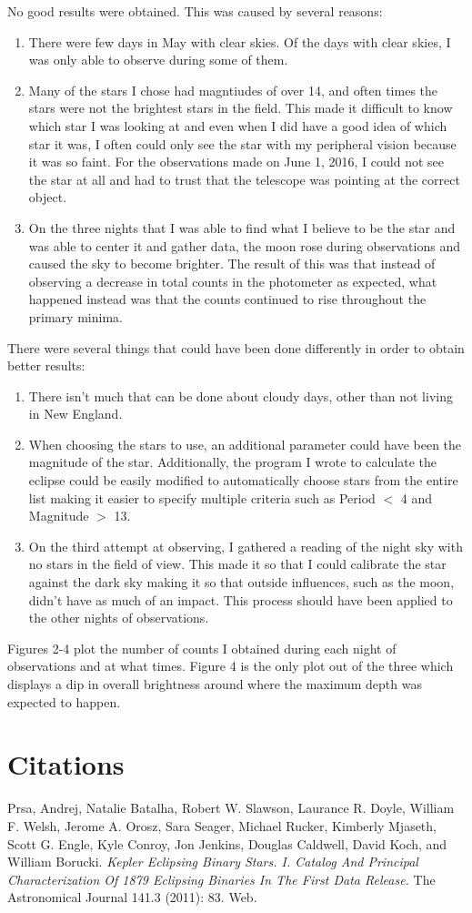 \documentclass[12pt]{article}
\begin{document}
	No good results were obtained. This was caused by several reasons:
	\begin{enumerate}
		\item There were few days in May with clear skies. Of the days with clear skies, I was only able to observe during some of them.
		\item Many of the stars I chose had magntiudes of over 14, and often times the stars were not the brightest stars in the field. This made it difficult to know which star I was looking at and even when I did have a good idea of which star it was, I often could only see the star with my peripheral vision because it was so faint. For the observations made on June 1, 2016, I could not see the star at all and had to trust that the telescope was pointing at the correct object.
		\item On the three nights that I was able to find what I believe to be the star and was able to center it and gather data, the moon rose during observations and caused the sky to become brighter. The result of this was that instead of observing a decrease in total counts in the photometer as expected, what happened instead was that the counts continued to rise throughout the primary minima.
	\end{enumerate}
	There were several things that could have been done differently in order to obtain better results:
	\begin{enumerate}
		\item There isn't much that can be done about cloudy days, other than not living in New England.
		\item When choosing the stars to use, an additional parameter could have been the magnitude of the star. Additionally, the program I wrote to calculate the eclipse could be easily modified to automatically choose stars from the entire list making it easier to specify multiple criteria such as Period $<$ 4 and Magnitude $>$ 13.
		\item On the third attempt at observing, I gathered a reading of the night sky with no stars in the field of view. This made it so that I could calibrate the star against the dark sky making it so that outside influences, such as the moon, didn't have as much of an impact. This process should have been applied to the other nights of observations.
	\end{enumerate}
	Figures 2-4 plot the number of counts I obtained during each night of observations and at what times. Figure 4 is the only plot out of the three which displays a dip in overall brightness around where the maximum depth was expected to happen.
	
	\section{Citations}
	
	 Prsa, Andrej, Natalie Batalha, Robert W. Slawson, Laurance R. Doyle, William F. Welsh, Jerome A. Orosz, Sara Seager, Michael Rucker, Kimberly Mjaseth, Scott G. Engle, Kyle Conroy, Jon Jenkins, Douglas Caldwell, David Koch, and William Borucki. \textit{Kepler Eclipsing Binary Stars. I. Catalog And Principal Characterization Of 1879 Eclipsing Binaries In The First Data Release.} The Astronomical Journal 141.3 (2011): 83. Web. 
	
\end{document}
